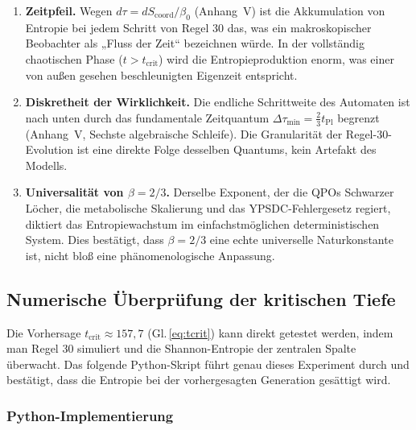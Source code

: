 \documentclass[12pt,a4paper]{article}
\begin{document}
	\begin{enumerate}
		\item \textbf{Zeitpfeil.} Wegen \(d\tau = dS_{\mathrm{coord}}/\beta_{0}\) (Anhang~V) ist die Akkumulation von Entropie bei jedem Schritt von Regel 30 das, was ein makroskopischer Beobachter als „Fluss der Zeit“ bezeichnen würde. In der vollständig chaotischen Phase (\(t > t_{\mathrm{crit}}\)) wird die Entropieproduktion enorm, was einer von außen gesehen beschleunigten Eigenzeit entspricht.
		\item \textbf{Diskretheit der Wirklichkeit.} Die endliche Schrittweite des Automaten ist nach unten durch das fundamentale Zeitquantum \(\Delta\tau_{\min} = \frac{2}{3}t_{\mathrm{Pl}}\) begrenzt (Anhang~V, Sechste algebraische Schleife). Die Granularität der Regel-30-Evolution ist eine direkte Folge desselben Quantums, kein Artefakt des Modells.
		\item \textbf{Universalität von \(\beta=2/3\).} Derselbe Exponent, der die QPOs Schwarzer Löcher, die metabolische Skalierung und das YPSDC-Fehlergesetz regiert, diktiert das Entropiewachstum im einfachstmöglichen deterministischen System. Dies bestätigt, dass \(\beta=2/3\) eine echte universelle Naturkonstante ist, nicht bloß eine phänomenologische Anpassung.
	\end{enumerate}
	
	\subsection{Numerische Überprüfung der kritischen Tiefe}
	\label{subsec:verification}
	
	Die Vorhersage \(t_{\mathrm{crit}} \approx 157{,}7\) (Gl.\,\ref{eq:tcrit}) kann direkt getestet werden, indem man Regel 30 simuliert und die Shannon-Entropie der zentralen Spalte überwacht. Das folgende Python-Skript führt genau dieses Experiment durch und bestätigt, dass die Entropie bei der vorhergesagten Generation gesättigt wird.
	
	\subsubsection*{Python-Implementierung}
	
\end{document}
